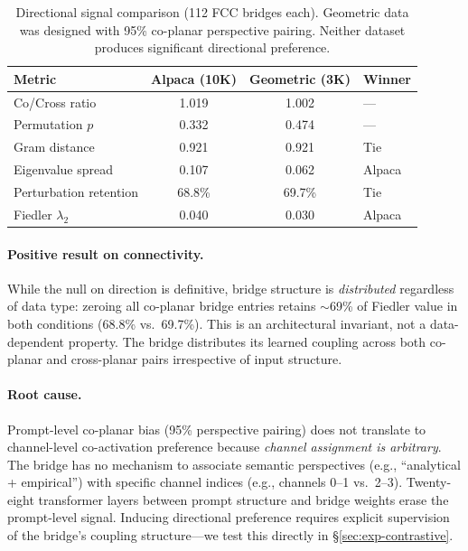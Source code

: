 \begin{table}[t]
\centering
\caption{Directional signal comparison (112 FCC bridges each). Geometric
data was designed with 95\% co-planar perspective pairing. Neither dataset
produces significant directional preference.}
\label{tab:direction-null}
\small
\begin{tabular}{@{}lccl@{}}
\toprule
Metric & Alpaca (10K) & Geometric (3K) & Winner \\
\midrule
Co/Cross ratio         & 1.019 & 1.002 & --- \\
Permutation $p$        & 0.332 & 0.474 & --- \\
Gram distance          & 0.921 & 0.921 & Tie \\
Eigenvalue spread      & 0.107 & 0.062 & Alpaca \\
Perturbation retention & 68.8\% & 69.7\% & Tie \\
Fiedler $\lambda_2$    & 0.040 & 0.030 & Alpaca \\
\bottomrule
\end{tabular}
\end{table}

\paragraph{Positive result on connectivity.}
While the null on direction is definitive, bridge structure is
\emph{distributed} regardless of data type: zeroing all co-planar bridge
entries retains $\sim$69\% of Fiedler value in both conditions
(68.8\% vs.\ 69.7\%). This is an architectural invariant, not a
data-dependent property. The bridge distributes its learned coupling
across both co-planar and cross-planar pairs irrespective of input
structure.

\paragraph{Root cause.}
Prompt-level co-planar bias (95\% perspective pairing) does not translate
to channel-level co-activation preference because \emph{channel assignment
is arbitrary}. The bridge has no mechanism to associate semantic perspectives
(e.g., ``analytical + empirical'') with specific channel indices (e.g.,
channels 0--1 vs.\ 2--3). Twenty-eight transformer layers between prompt
structure and bridge weights erase the prompt-level signal. Inducing
directional preference requires explicit supervision of the bridge's
coupling structure---we test this directly in
\S\ref{sec:exp-contrastive}.

